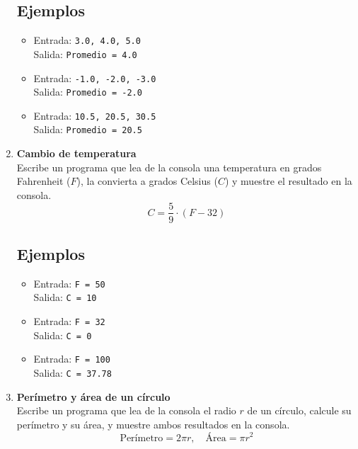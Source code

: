 \begin{enumerate}
    \subsection*{Ejemplos}
    \begin{itemize}
        \item Entrada: \texttt{3.0, 4.0, 5.0}\\
              Salida: \texttt{Promedio = 4.0}
        \item Entrada: \texttt{-1.0, -2.0, -3.0}\\
              Salida: \texttt{Promedio = -2.0}
        \item Entrada: \texttt{10.5, 20.5, 30.5}\\
              Salida: \texttt{Promedio = 20.5}
    \end{itemize}

    \item \textbf{Cambio de temperatura}\\
    Escribe un programa que lea de la consola una temperatura en grados Fahrenheit (\(F\)), la convierta a grados Celsius (\(C\)) y muestre el resultado en la consola.\\ 
    \[
    C = \frac{5}{9} \cdot (F - 32)
    \]
    \subsection*{Ejemplos}
    \begin{itemize}
        \item Entrada: \texttt{F = 50}\\
              Salida: \texttt{C = 10}
        \item Entrada: \texttt{F = 32}\\
              Salida: \texttt{C = 0}
        \item Entrada: \texttt{F = 100}\\
              Salida: \texttt{C = 37.78}
    \end{itemize}

    \item \textbf{Perímetro y área de un círculo}\\
    Escribe un programa que lea de la consola el radio \(r\) de un círculo, calcule su perímetro y su área, y muestre ambos resultados en la consola.\\   
    \[
    \text{Perímetro} = 2\pi r, \quad \text{Área} = \pi r^2
    \]

\end{enumerate}
